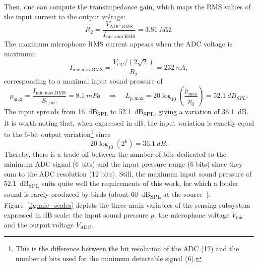 \documentclass{EPL-master-thesis-covers-EN}
\newcommand{\te}[1]{\textrm{#1}}
\begin{document}
Then, one can compute the transimpedance gain, which maps the RMS values of the input current to the output voltage:
\[
 R_2 = \frac{V_\te{ADC,RMS}}{I_{\te{mic,min,RMS}}} = \SI{3.81}{M\ohm}.
\]
The maximum microphone RMS current appears when the ADC voltage is maximum:
\[
 I_{\te{mic,max,RMS}} = \frac{V_\te{CC}/(2\sqrt{2})}{R_2} = \SI{232}{nA},
\]
corresponding to a maximal input sound pressure of
\[
   p_\te{max} = \frac{I_{\te{mic,max,RMS}}}{S_{\te{I,mic}}} = \SI{8.1}{mPa} \quad \Rightarrow \quad L_{p,\te{max}} = 20\log_{10}\left(\frac{p_\te{max}}{p_0}\right) = \SI{52.1}{dB_{SPL}}.
\]
The input spreads from \SI{16}{dB_{SPL}} to \SI{52.1}{dB_{SPL}}, giving a variation of \SI{36.1}{dB}. It is worth noting that, when expressed in dB, the input variation is exactly equal to the 6-bit output variation\footnote{This is the difference between the bit resolution of the ADC (12) and the number of bits used for the minimum detectable signal (6).} since 
\[
 20\log_{10}\left(2^{6}\right) = \SI{36.1}{dB}.
\]
Thereby, there is a trade-off between the number of bits dedicated to the minimum ADC signal (6 bits) and the input pressure range (6 bits) since they sum to the ADC resolution (12 bits). Still, the maximum input sound pressure of \SI{52.1}{dB_{SPL}} suits quite well the requirements of this work, for which a louder sound is rarely produced by birds (about \SI{60}{dB_{SPL}} at the source~\cite{10.1007/s00265-009-0743-4}).
Figure~\ref{fig:mic_scales} depicts the three main variables of the sensing subsystem expressed in dB scale: the input sound pressure $p$, the microphone voltage $V_{\te{mic}}$ and the output voltage $V_\te{ADC}$.
\end{document}
